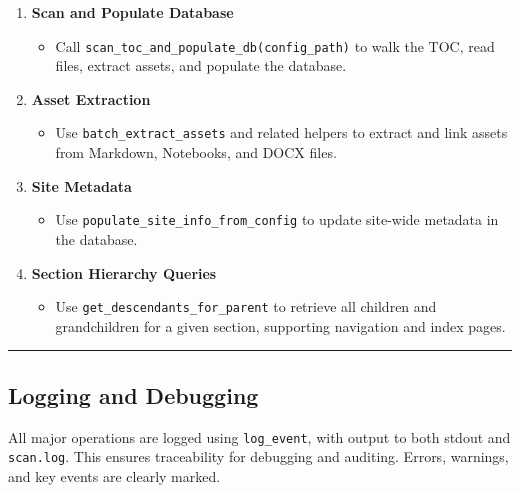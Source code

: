 \begin{enumerate}
\def\labelenumi{\arabic{enumi}.}
\tightlist
\item
  \textbf{Scan and Populate Database}

  \begin{itemize}
  \tightlist
  \item
    Call \texttt{scan\_toc\_and\_populate\_db(config\_path)} to walk the
    TOC, read files, extract assets, and populate the database.
  \end{itemize}
\item
  \textbf{Asset Extraction}

  \begin{itemize}
  \tightlist
  \item
    Use \texttt{batch\_extract\_assets} and related helpers to extract
    and link assets from Markdown, Notebooks, and DOCX files.
  \end{itemize}
\item
  \textbf{Site Metadata}

  \begin{itemize}
  \tightlist
  \item
    Use \texttt{populate\_site\_info\_from\_config} to update site-wide
    metadata in the database.
  \end{itemize}
\item
  \textbf{Section Hierarchy Queries}

  \begin{itemize}
  \tightlist
  \item
    Use \texttt{get\_descendants\_for\_parent} to retrieve all children
    and grandchildren for a given section, supporting navigation and
    index pages.
  \end{itemize}
\end{enumerate}

\begin{center}\rule{0.5\linewidth}{0.5pt}\end{center}

\subsection{Logging and Debugging}\label{logging-and-debugging}

All major operations are logged using \texttt{log\_event}, with output
to both stdout and \texttt{scan.log}. This ensures traceability for
debugging and auditing. Errors, warnings, and key events are clearly
marked.

